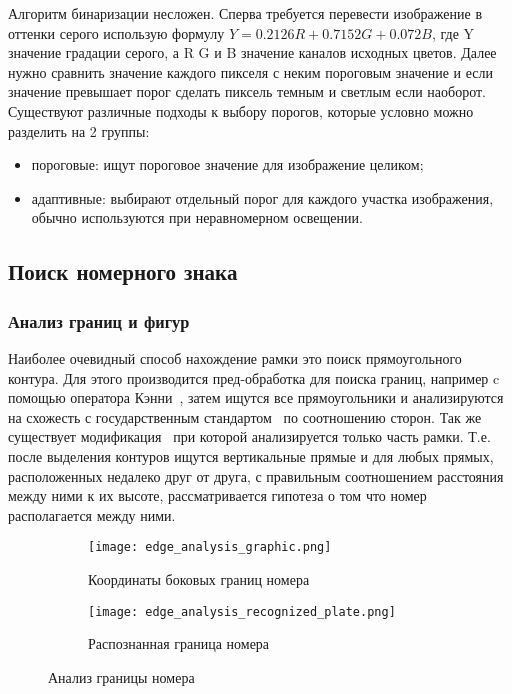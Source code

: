 Алгоритм бинаризации несложен. Сперва требуется перевести изображение в оттенки серого использую формулу $ Y = 0.2126R + 0.7152G + 0.072B $, где Y значение градации серого, а R G и B значение каналов исходных цветов. Далее нужно сравнить значение каждого пикселя с неким пороговым значение и если значение превышает порог сделать пиксель темным и светлым если наоборот. 
Существуют различные подходы к выбору порогов, которые условно можно разделить на 2 группы:
\begin{itemize}
  \item пороговые: ищут пороговое значение для изображение целиком;
  \item адаптивные: выбирают отдельный порог для каждого участка изображения, обычно используются при неравномерном освещении.
\end{itemize}


\subsection{Поиск номерного знака}
\label{sub:domain:search}

\subsubsection{Анализ границ и фигур}
\label{sub:domain:search:edges_analisys}

Наиболее очевидный способ нахождение рамки это поиск прямоугольного контура. Для этого производится пред-обработка для поиска границ, например c помощью оператора Кэнни~\cite{canny_edge_detector}, затем ищутся все прямоугольники и анализируются на схожесть с государственным стандартом~\cite{stb_914_99} по соотношению сторон. Так же существует модификация~\cite{recognition_using_hought} при которой анализируется только часть рамки. Т.е. после выделения контуров ищутся вертикальные прямые и для любых прямых, расположенных недалеко друг от друга, с правильным соотношением расстояния между ними к их высоте, рассматривается гипотеза о том что номер располагается между ними. 

\begin{figure}[ht]
\centering
  \begin{subfigure}[b]{0.48\textwidth} 
    \centering
    \texttt{[image: edge\_analysis\_graphic.png]}  
    \caption{Координаты боковых границ номера}
  \end{subfigure}
  \begin{subfigure}[b]{0.48\textwidth} 
    \centering
    \texttt{[image: edge\_analysis\_recognized\_plate.png]}  
    \caption{Распознанная граница номера}
  \end{subfigure}
  \caption{Анализ границы номера}
  \label{fig:domain:search:edges_analisys:edge_graphic}
\end{figure}


